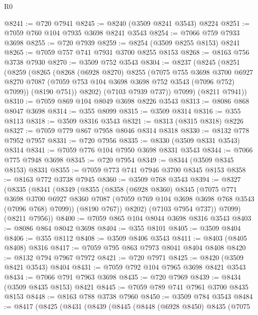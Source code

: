 \begin{lexlean}{R0}
\begin{coremodule}
@8241 := @720 @7941
@8245 := @8240 (@3509 @8241 @3543) @8224
@8251 := @7059 @760 @104 @7935 @3698 @8241 @3543
@8254 := @7066 @759 @7933 @3698
@8255 := @720 @7939
@8259 := @8254 (@3509 @8255 @8153) @8241
@8265 := @7059 @757 @741 @7931 @3700 @8255 @8153
@8268 := @8163 @756 @3738 @7930
@8270 := @3509 @752 @3543
@8304 := @8237
    (@8245
      (@8251
        (@8259
          (@8265
            (@8268
              (@6928 @8270)
              @8255
              (@7075
                @755
                @3698
                @3700
                @6927
                @8270
                @7087
                (@7059 @753 @104 @3698 @3698 @752 @3543 (@7096 @752) @7099))
              (@8190 @751))
            @8202)
          (@7103 @7939 @737))
        @7099)
      (@8211 @7941))
@8310 := @7059 @869 @104 @8049 @3698 @8226 @3543
@8313 := @8086 @868 @8047 @3698
@8314 := @355 @8099
@8315 := @3509 @8314
@8316 := @355 @8113
@8318 := @3509 @8316 @3543
@8321 := @8313 (@8315 @8318) @8226
@8327 := @7059 @779 @867 @7958 @8046 @8314 @8318
@8330 := @8132 @778 @7952 @7957
@8331 := @720 @7956
@8335 := @8330 (@3509 @8331 @3543) @8314
@8341 := @7059 @776 @104 @7950 @3698 @8331 @3543
@8344 := @7066 @775 @7948 @3698
@8345 := @720 @7954
@8349 := @8344 (@3509 @8345 @8153) @8331
@8355 := @7059 @773 @741 @7946 @3700 @8345 @8153
@8358 := @8163 @772 @3738 @7945
@8360 := @3509 @768 @3543
@8394 := @8327
    (@8335
      (@8341
        (@8349
          (@8355
            (@8358
              (@6928 @8360)
              @8345
              (@7075
                @771
                @3698
                @3700
                @6927
                @8360
                @7087
                (@7059 @769 @104 @3698 @3698 @768 @3543 (@7096 @768) @7099))
              (@8190 @767))
            @8202)
          (@7103 @7954 @737))
        @7099)
      (@8211 @7956))
@8400 := @7059 @865 @104 @8044 @3698 @8316 @3543
@8403 := @8086 @864 @8042 @3698
@8404 := @355 @8101
@8405 := @3509 @8404
@8406 := @355 @8112
@8408 := @3509 @8406 @3543
@8411 := @8403 (@8405 @8408) @8316
@8417 := @7059 @795 @863 @7973 @8041 @8404 @8408
@8420 := @8132 @794 @7967 @7972
@8421 := @720 @7971
@8425 := @8420 (@3509 @8421 @3543) @8404
@8431 := @7059 @792 @104 @7965 @3698 @8421 @3543
@8434 := @7066 @791 @7963 @3698
@8435 := @720 @7969
@8439 := @8434 (@3509 @8435 @8153) @8421
@8445 := @7059 @789 @741 @7961 @3700 @8435 @8153
@8448 := @8163 @788 @3738 @7960
@8450 := @3509 @784 @3543
@8484 := @8417
    (@8425
      (@8431
        (@8439
          (@8445
            (@8448
              (@6928 @8450)
              @8435
              (@7075

\end{coremodule}
\end{lexlean}
